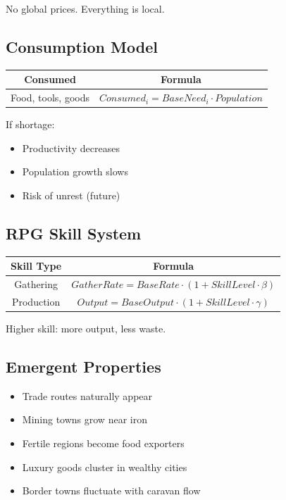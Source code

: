 No global prices. Everything is local.



\subsection{Consumption Model}

\begin{table}[H]
\centering
\begin{tabular}{|c|c|}
\hline
Consumed & Formula \\
\hline
Food, tools, goods & $Consumed_i = BaseNeed_i \cdot Population$ \\
\hline
\end{tabular}
\end{table}

If shortage:

\begin{itemize}
\item Productivity decreases
\item Population growth slows
\item Risk of unrest (future)
\end{itemize}



\subsection{RPG Skill System}

\begin{table}[H]
\centering
\begin{tabular}{|c|c|}
\hline
Skill Type & Formula \\
\hline
Gathering & $GatherRate = BaseRate \cdot (1 + SkillLevel \cdot \beta)$ \\
Production & $Output = BaseOutput \cdot (1 + SkillLevel \cdot \gamma)$ \\
\hline
\end{tabular}
\end{table}

Higher skill: more output, less waste.



\subsection{Emergent Properties}

\begin{itemize}
\item Trade routes naturally appear
\item Mining towns grow near iron
\item Fertile regions become food exporters
\item Luxury goods cluster in wealthy cities
\item Border towns fluctuate with caravan flow
\end{itemize}



